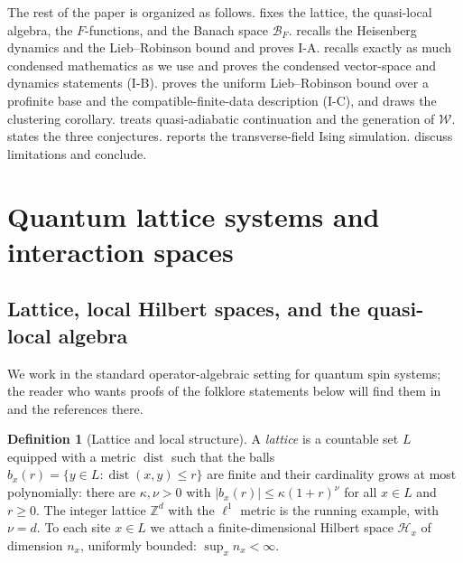 \documentclass[12pt]{article}
\newcommand{\Ffun}{F}                          %
\newcommand{\BF}{\mathcal{B}_{F}}              %
\newcommand{\Weq}{\mathcal{W}}                 %
\newcommand{\dist}{\operatorname{dist}}
\newcommand{\Z}{\mathbb{Z}}
\theoremstyle{definition}
\newtheorem{definition}[theorem]{Definition}
\theoremstyle{remark}
\begin{document}
\medskip
The rest of the paper is organized as follows.  fixes the lattice, the
quasi-local algebra, the $\Ffun$-functions, and the Banach space $\BF$.  recalls
the Heisenberg dynamics and the Lieb--Robinson bound and proves I-A. 
recalls exactly as much condensed mathematics as we use and proves the condensed vector-space
and dynamics statements (I-B).  proves the uniform Lieb--Robinson bound over
a profinite base and the compatible-finite-data description (I-C), and draws the clustering
corollary.  treats quasi-adiabatic continuation and the generation of $\Weq$.
 states the three conjectures.  reports the
transverse-field Ising simulation.  discuss limitations
and conclude.

\section{Quantum lattice systems and interaction spaces}
\label{sec:framework}

\subsection{Lattice, local Hilbert spaces, and the quasi-local algebra}
\label{sec:framework-lattice}

We work in the standard operator-algebraic setting for quantum spin systems; the reader who
wants proofs of the folklore statements below will find them in~\cite{nsy-quasilocality-1}
and the references there.

\begin{definition}[Lattice and local structure]
\label{def:lattice}
A \emph{lattice} is a countable set $L$ equipped with a metric $\dist$ such that the balls
$b_x(r)=\{y\in L : \dist(x,y)\le r\}$ are finite and their cardinality grows at most
polynomially: there are $\kappa,\nu>0$ with $\lvert b_x(r)\rvert\le\kappa(1+r)^\nu$ for all
$x\in L$ and $r\ge 0$. The integer lattice $\Z^d$ with the $\ell^1$ metric is the running
example, with $\nu=d$. To each site $x\in L$ we attach a finite-dimensional Hilbert space
$\mathcal H_x$ of dimension $n_x$, uniformly bounded: $\sup_x n_x<\infty$.
\end{definition}
\end{document}
